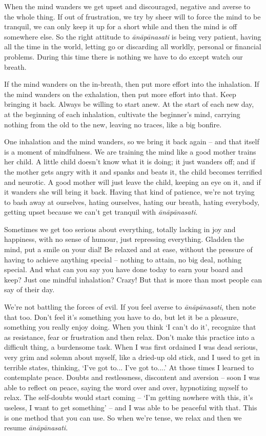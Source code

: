 When the mind wanders we get upset and discouraged, negative and averse to the whole thing. If out of frustration, we try by sheer will to force the mind to be tranquil, we can only keep it up for a short while and then the mind is off somewhere else. So the right attitude to \textit{\=an\=ap\=anasati} is being very patient, having all the time in the world, letting go or discarding all worldly, personal or financial problems. During this time there is nothing we have to do except watch our breath.

If the mind wanders on the in-breath, then put more effort into the inhalation. If the mind wanders on the exhalation, then put more effort into that. Keep bringing it back. Always be willing to start anew. At the start of each new day, at the beginning of each inhalation, cultivate the beginner's mind, carrying nothing from the old to the new, leaving no traces, like a big bonfire.

One inhalation and the mind wanders, so we bring it back again -- and that itself is a moment of mindfulness. We are training the mind like a good mother trains her child. A little child doesn't know what it is doing; it just wanders off; and if the mother gets angry with it and spanks and beats it, the child becomes terrified and neurotic. A good mother will just leave the child, keeping an eye on it, and if it wanders she will bring it back. Having that kind of patience, we're not trying to bash away at ourselves, hating ourselves, hating our breath, hating everybody, getting upset because we can't get tranquil with \textit{\=an\=ap\=anasati}.

Sometimes we get too serious about everything, totally lacking in joy and happiness, with no sense of humour, just repressing everything. Gladden the mind, put a smile on your dial! Be relaxed and at ease, without the pressure of having to achieve anything special -- nothing to attain, no big deal, nothing special. And what can you say you have done today to earn your board and keep? Just one mindful inhalation? Crazy! But that is more than most people can say of their day.

We're not battling the forces of evil. If you feel averse to \textit{\=an\=ap\=anasati}, then note that too. Don't feel it's something you have to do, but let it be a pleasure, something you really enjoy doing. When you think `I can't do it', recognize that as resistance, fear or frustration and then relax. Don't make this practice into a difficult thing, a burdensome task.  When I was first ordained I was dead serious, very grim and solemn about myself, like a dried-up old stick, and I used to get in terrible states, thinking, `I've got to... I've got to....' At those times I learned to contemplate peace. Doubts and restlessness, discontent and aversion -- soon I was able to reflect on peace, saying the word over and over, hypnotizing myself to relax. The self-doubts would start coming -- `I'm getting nowhere with this, it's useless, I want to get something' -- and I was able to be peaceful with that. This is one method that you can use. So when we're tense, we relax and then we resume \textit{\=an\=ap\=anasati}.

